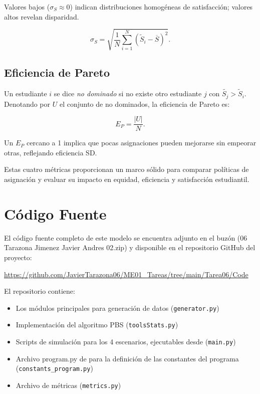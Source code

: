 \documentclass{article}
\begin{document}
Valores bajos ($\sigma_S \approx0$) indican distribuciones homogéneas de satisfacción; valores altos revelan disparidad.

$$
\sigma_S = \sqrt{ \frac{1}{N} \sum_{i=1}^N (\widetilde S_i - \overline S)^2 }.
$$

\subsection{Eficiencia de Pareto}
Un estudiante $i$ se dice \emph{no dominado} si no existe otro estudiante 
$j$ con $\widetilde{S_j} > \widetilde S_i$. Denotando por $U$ el
 conjunto de no dominados, la eficiencia de Pareto es:

$$
E_P = \frac{|U|}{N}.
$$

Un $E_P$ cercano a 1 implica que pocas asignaciones pueden mejorarse sin empeorar otras, reflejando eficiencia SD.

Estas cuatro métricas proporcionan un marco sólido para comparar políticas de asignación y evaluar su impacto en equidad, eficiencia y satisfacción estudiantil.



\section{Código Fuente}\label{sec:cod}

El código fuente completo de este modelo se encuentra adjunto en el buzón 
(06 Tarazona Jimenez Javier Andres 02.zip)
y disponible en el repositorio GitHub del proyecto:

\begin{center}
\url{https://github.com/JavierTarazona06/ME01_Tareas/tree/main/Tarea06/Code}
\end{center}

El repositorio contiene:
\begin{itemize}
\item Los módulos principales para generación de datos (\texttt{generator.py})
\item Implementación del algoritmo PBS (\texttt{toolsStats.py})
\item Scripts de simulación para los 4 escenarios, ejecutables desde (\texttt{main.py})
\item Archivo program.py de para la definición de las constantes del programa 
    (\texttt{constants\_program.py})
\item Archivo de métricas (\texttt{metrics.py})
\end{itemize}
\end{document}
